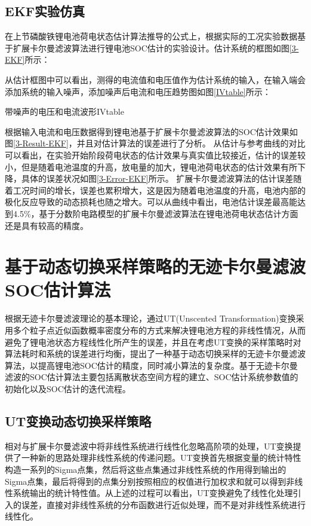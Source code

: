 \subsection{EKF实验仿真}
在上节磷酸铁锂电池荷电状态估计算法推导的公式上，根据实际的工况实验数据基于扩展卡尔曼滤波算法进行锂电池SOC估计的实验设计。估计系统的框图如图\ref{3-EKF}所示：

从估计框图中可以看出，测得的电流值和电压值作为估计系统的输入，在输入端会添加系统的输入噪声，添加噪声后电流和电压趋势图如图\ref{IVtable}所示：
\begin{pics}[htbp]{带噪声的电压和电流波形}{IVtable}
\end{pics}

根据输入电流和电压数据得到锂电池基于扩展卡尔曼滤波算法的SOC估计效果如图\ref{3-Result-EKF}，并且对估计算法的误差进行了分析。
从估计与参考曲线的对比可以看出，在实验开始阶段荷电状态的估计效果与真实值比较接近，估计的误差较小，但是随着电池温度的升高，放电量的加大，锂电池荷电状态的估计效果有所下降，具体的误差状况如图\ref{3-Error-EKF}所示。
扩展卡尔曼滤波算法的估计误差随着工况时间的增长，误差也累积增大，这是因为随着电池温度的升高，电池内部的极化反应导致的动态损耗也随之增大。可以从曲线中看出，电池估计误差最高能达到4.5$\% $，基于分数阶电路模型的扩展卡尔曼滤波算法在锂电池荷电状态估计方面还是具有较高的精度。
\section{基于动态切换采样策略的无迹卡尔曼滤波SOC估计算法}
根据无迹卡尔曼滤波理论的基本理论，通过UT(Unscented Transformation)变换采用多个粒子点近似函数概率密度分布的方式来解决锂电池方程的非线性情况，从而避免了锂电池状态方程线性化所产生的误差，并且在考虑UT变换的采样策略时对算法耗时和系统的误差进行均衡，提出了一种基于动态切换采样的无迹卡尔曼滤波算法，以提高锂电池SOC估计的精度，同时减小算法的复杂度。基于无迹卡尔曼滤波的SOC估计算法主要包括离散状态空间方程的建立、SOC估计系统参数值的初始化以及SOC估计的迭代流程。
\subsection{UT变换动态切换采样策略}
相对与扩展卡尔曼滤波中将非线性系统进行线性化忽略高阶项的处理，UT变换提供了一种新的思路处理非线性系统的传递问题。UT变换首先根据变量的统计特性构造一系列的Sigma点集，然后将这些点集通过非线性系统的作用得到输出的Sigma点集，最后将得到的点集分别按照相应的权值进行加权求和就可以得到非线性系统输出的统计特性值。从上述的过程可以看出，UT变换避免了线性化处理引入的误差，直接对非线性系统的分布函数进行近似处理，而不是对非线性系统进行线性化。

